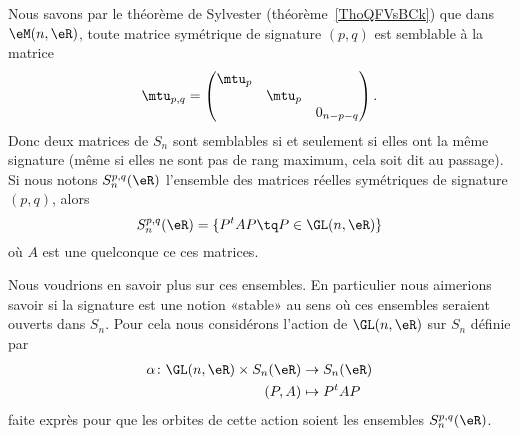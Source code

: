 Nous savons par le théorème de Sylvester (théorème~\ref{ThoQFVsBCk}) que dans \( \eM(n,\eR)\), toute matrice symétrique de signature \( (p,q)\) est semblable à la matrice
\begin{equation}
	\mtu_{p,q}=\begin{pmatrix}
		\mtu_p &          &           \\
		       & \mtu_{p} &           \\
		       &          & 0_{n-p-q}
	\end{pmatrix}.
\end{equation}
Donc deux matrices de \( S_n\) sont semblables si et seulement si elles ont la même signature (même si elles ne sont pas de rang maximum, cela soit dit au passage). Si nous notons \( S_n^{p,q}(\eR)\) l'ensemble des matrices réelles symétriques de signature \( (p,q)\), alors
\begin{equation}
	S_n^{p,q}(\eR)=\{ P^tAP\tq P\in \GL(n,\eR) \}
\end{equation}
où \( A\) est une quelconque ce ces matrices.

Nous voudrions en savoir plus sur ces ensembles. En particulier nous aimerions savoir si la signature est une notion «stable» au sens où ces ensembles seraient ouverts dans \( S_n\). Pour cela nous considérons l'action de \( \GL(n,\eR)\) sur \( S_n\) définie par
\begin{equation}
	\begin{aligned}
		\alpha\colon \GL(n,\eR)\times S_n(\eR) & \to S_n(\eR)  \\
		(P,A)                                  & \mapsto P^tAP
	\end{aligned}
\end{equation}
faite exprès pour que les orbites de cette action soient les ensembles \( S_n^{p,q}(\eR)\).

